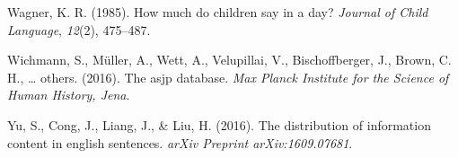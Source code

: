 \documentclass[man,floatsintext]{apa6}
\begin{document}
\leavevmode\hypertarget{ref-wagner1985}{}%
Wagner, K. R. (1985). How much do children say in a day? \emph{Journal of Child Language}, \emph{12}(2), 475--487.

\leavevmode\hypertarget{ref-wichmann2016}{}%
Wichmann, S., Müller, A., Wett, A., Velupillai, V., Bischoffberger, J., Brown, C. H., \ldots{} others. (2016). The asjp database. \emph{Max Planck Institute for the Science of Human History, Jena}.

\leavevmode\hypertarget{ref-yu2016}{}%
Yu, S., Cong, J., Liang, J., \& Liu, H. (2016). The distribution of information content in english sentences. \emph{arXiv Preprint arXiv:1609.07681}.

\endgroup
\end{document}
